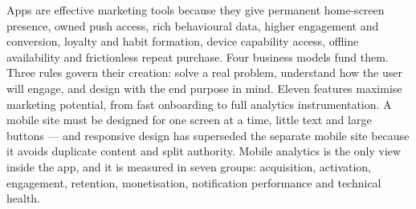 \begin{summarybox}
Apps are effective marketing tools because they give permanent home-screen
presence, owned push access, rich behavioural data, higher engagement and
conversion, loyalty and habit formation, device capability access, offline
availability and frictionless repeat purchase. Four business models fund them.
Three rules govern their creation: solve a real problem, understand how the user
will engage, and design with the end purpose in mind. Eleven features maximise
marketing potential, from fast onboarding to full analytics instrumentation. A
mobile site must be designed for one screen at a time, little text and large
buttons --- and responsive design has superseded the separate mobile site because
it avoids duplicate content and split authority. Mobile analytics is the only view
inside the app, and it is measured in seven groups: acquisition, activation,
engagement, retention, monetisation, notification performance and technical
health.
\end{summarybox}
